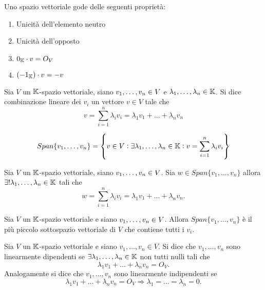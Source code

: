 \begin{propriety} Uno spazio vettoriale gode delle seguenti proprietà:
	\begin{enumerate}
		\item Unicità dell'elemento neutro
		\item Unicità dell'opposto
		\item $ 0_{\mathbb{K}} \cdot v = O_V $
		\item $ (-1_{\mathbb{K}}) \cdot v = -v $
	\end{enumerate}
\end{propriety}

\begin{definition}
	Sia $ V $ un $ \mathbb{K} $-spazio vettoriale, siano $ v_1, \ldots , v_n \in \nobreak V $ e $ \lambda_1, \ldots , \lambda_n \in \mathbb{K} $. 
	Si dice combinazione lineare dei $ v_i $ un vettore $ v \in V $ tale che 
	\[v = \sum_{i=1}^{n} \lambda_i v_i = \lambda_1 v_1 + \ldots + \lambda_n v_n \]
\end{definition}

\begin{definition}[Span]
	\[Span\{v_1, \ldots , v_n\} = \left\{ v \in V: \exists \lambda_1, \ldots , \lambda_n \in \mathbb{K}: v = \sum_{i=1}^{n} \lambda_i v_i \right\}\]
\end{definition}

\begin{prop}
	Sia $ V $ un $ \mathbb{K} $-spazio vettoriale, siano $ v_1, \ldots , v_n \in \nobreak V $. Sia 
	$ w \in Span\{v_1, \ldots , v_n\}$ allora $\exists !  \lambda_1, \ldots , \lambda_n \in \mathbb{K}$ tali che
	\[w = \sum_{i=1}^{n} \lambda_i v_i = \lambda_1 v_1 + \ldots + \lambda_n v_n. \]  
\end{prop}

\begin{thm}
	Sia $ V $ un $ \mathbb{K} $-spazio vettoriale e siano $ v_1, \ldots , v_n \in \nolinebreak V $. 
	Allora $ Span\{v_1, \ldots , v_n\} $ è il più piccolo sottospazio vettoriale di $ V $ 
	che contiene tutti i $ v_i $.
\end{thm}

\begin{definition} 
	Sia $ V $ un $ \mathbb{K} $-spazio vettoriale e siano $ v_1, \ldots , v_n \in V $. Si dice che $ v_1, \ldots, v_n $ sono linearmente dipendenti se $ \exists \lambda_1, \ldots , \lambda_n \in \mathbb{K} $ non tutti nulli tali che \[\lambda_1 v_1 + \ldots + \lambda_n v_n = O_V.\] Analogamente si dice che $ v_1, \ldots, v_n $ sono linearmente indipendenti se \[\lambda_1 v_1 + \ldots + \lambda_n v_n = O_V \Rightarrow \lambda_1 = \ldots = \lambda_n = 0.\]	
\end{definition}

